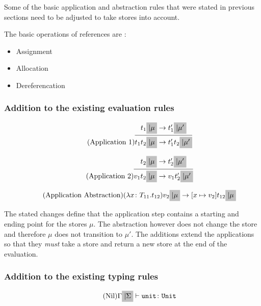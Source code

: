 Some of the basic application and abstraction rules that were stated in previous
sections need to be adjusted to take stores into account.

The basic operations of references are \cite{pierce2002ProgLang}:

\begin{itemize}
    \item Assignment
    \item Allocation
    \item Dereferencation
\end{itemize}

\subsubsection{Addition to the existing evaluation rules \cite{pierce2002ProgLang}}
\begin{equation*}
    \tag{Application 1}
    \infer{
        t_1 t_2 \colorbox{lightgray}{$| \mu$} \rightarrow t'_1 t_2 \colorbox{lightgray}{$| \mu'$}
    }{
        t_1 \colorbox{lightgray}{$| \mu$} \rightarrow t'_1 \colorbox{lightgray}{$| \mu'$}
    }
\end{equation*}

\begin{equation*}
    \tag{Application 2}
    \infer{
        v_1 t_2 \colorbox{lightgray}{$| \mu$} \rightarrow v_1 t'_2 \colorbox{lightgray}{$| \mu'$}
    }{
        t_2 \colorbox{lightgray}{$| \mu$} \rightarrow t'_2 \colorbox{lightgray}{$| \mu'$}
    }
\end{equation*}

\begin{equation*}
    \tag{Application Abstraction}
    (\lambda x \colon T_{11} . t_{12}) v_2 \colorbox{lightgray}{$| \mu$} \rightarrow [x \mapsto v_2] t_{12} \colorbox{lightgray}{$| \mu$}
\end{equation*}

The stated changes define that the application step contains
a starting and ending point for the stores $\mu$. The
abstraction however does not change the store and therefore $\mu$ does
not transition to $\mu'$. The additions extend the applications so that
they \textit{must} take a store and return a new store at the end
of the evaluation.

\subsubsection{Addition to the existing typing rules \cite{pierce2002ProgLang}}
\begin{equation*}
    \tag{Nil}
    \Gamma \colorbox{lightgray}{$| \Sigma$} \vdash \texttt{unit} \colon \texttt{Unit}
\end{equation*}

